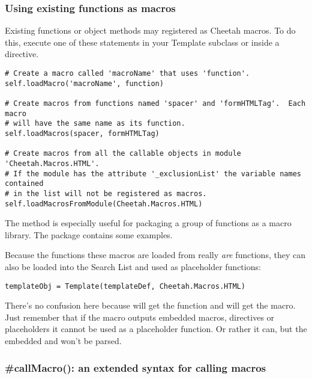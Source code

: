 \subsubsection{Using existing functions as macros}
\label{directives.macros.existingFunctions}
Existing functions or object methods may registered as Cheetah macros.  To do
this, execute one of these statements in your Template subclass or inside a
 directive.  

\begin{verbatim}
# Create a macro called 'macroName' that uses 'function'.
self.loadMacro('macroName', function)

# Create macros from functions named 'spacer' and 'formHTMLTag'.  Each macro
# will have the same name as its function.
self.loadMacros(spacer, formHTMLTag)

# Create macros from all the callable objects in module 'Cheetah.Macros.HTML'.
# If the module has the attribute '_exclusionList' the variable names contained
# in the list will not be registered as macros.
self.loadMacrosFromModule(Cheetah.Macros.HTML)
\end{verbatim}

The  method is especially useful for
packaging a group of functions as a macro library.  The 
package contains some examples.

Because the functions these macros are loaded from really {\em are} functions,
they can also be loaded into the Search List and used as placeholder functions:

\begin{verbatim}
templateObj = Template(templateDef, Cheetah.Macros.HTML)
\end{verbatim}

There's no confusion here because  will get the function and
 will get the macro.  Just remember that if the macro outputs
embedded macros, directives or placeholders it cannot be used as a placeholder
function.  Or rather it can, but the embedded  and
 won't be parsed.

\subsubsection{\#callMacro(): an extended syntax for calling macros}
\label{directives.macros.callMacro}

